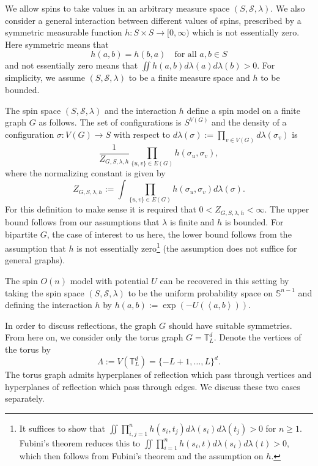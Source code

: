 \documentclass[12pt,reqno]{article}
\def\T{\mathbb{T}}
\def\cS{\mathcal{S}}
\renewcommand{\S}{\mathbb{S}}
\begin{document}
We allow spins to take values in an arbitrary measure space $(S,\cS, \lambda)$. We also consider a general interaction between different values of spins, prescribed by a symmetric measurable function $h \colon S \times S \to [0,\infty)$ which is not essentially zero.
Here symmetric means that
\begin{equation*}
  h(a,b)=h(b,a)\quad \text{for all $a,b \in S$}
\end{equation*}
and not essentially zero means that $\iint h(a,b)d\lambda(a)d\lambda(b)>0$. For simplicity, we assume $(S,\cS, \lambda)$ to be a finite measure space and $h$ to be bounded.

The spin space $(S,\cS, \lambda)$ and the interaction $h$ define a spin model on a finite graph $G$ as follows. The set of configurations is $S^{V(G)}$ and the density of a configuration $\sigma\colon V(G) \to S$ with respect to $d\lambda(\sigma) := \prod_{v \in V(G)} d\lambda(\sigma_v)$ is
\begin{equation}\label{eq:def_density_general_interaction}
\frac{1}{Z_{G,S,\lambda,h}} \prod_{\{u,v\} \in E(G)} h(\sigma_u,\sigma_v),
\end{equation}
where the normalizing constant is given by
\begin{equation*}
  Z_{G,S,\lambda,h} := \int \prod_{\{u,v\} \in E(G)} h(\sigma_u,\sigma_v)d\lambda(\sigma).
\end{equation*}
For this definition to make sense it is required that $0 < Z_{G,S,\lambda,h} < \infty$. The upper bound follows from our assumptions that $\lambda$ is finite and $h$ is bounded. For bipartite $G$, the case of interest to us here, the lower bound follows from the assumption that $h$ is not essentially zero\footnote{It suffices to show that $\iint \prod_{i,j=1}^n h(s_i,t_j)d\lambda(s_i)d\lambda(t_j)>0$ for $n\ge 1$. Fubini's theorem reduces this to $\iint \prod_{i=1}^n h(s_i,t)d\lambda(s_i)d\lambda(t)>0$, which then follows from Fubini's theorem and the assumption on $h$.} (the assumption does not suffice for general graphs).

The spin $O(n)$ model with potential $U$ can be recovered in this setting by taking the spin space $(S,\cS,\lambda)$ to be the uniform probability space on $\S^{n-1}$ and defining the interaction $h$ by $h(a,b):=\exp(-U(\left\langle a,b\right\rangle))$.

In order to discuss reflections, the graph $G$ should have suitable symmetries. From here on, we consider only the torus graph $G=\T_L^d$. Denote the vertices of the torus by
\begin{equation*}
  \Lambda := V(\T_L^d) = \{-L+1,\dots,L\}^d.
\end{equation*}
The torus graph admits hyperplanes of reflection which pass through vertices and hyperplanes of reflection which pass through edges. We discuss these two cases separately.
\end{document}
